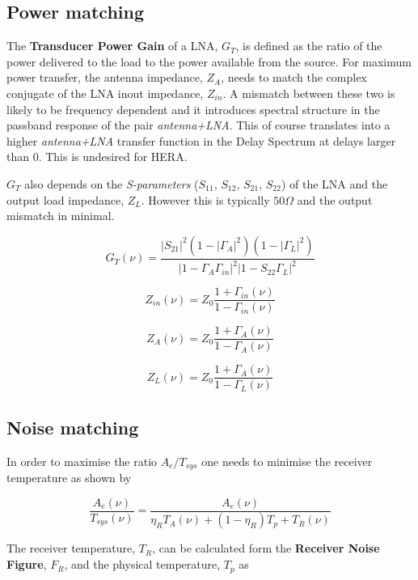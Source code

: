 \documentclass[11pt]{article}
\begin{document}
\subsection{Power matching}
The {\bf Transducer Power Gain} of a LNA, $G_T$, is defined as the ratio of the power delivered to the load to the power available from the source.
For maximum power transfer, the antenna impedance, $Z_A$, needs to match the complex conjugate of the LNA inout impedance, $Z_{in}$. A mismatch between these two is likely to be frequency dependent and it introduces spectral structure in the passband response of the pair {\em antenna+LNA}. This of course translates into a higher {\em antenna+LNA} transfer function in the Delay Spectrum at delays larger than 0. This is undesired for HERA.

$G_T$ also depends on the {\em S-parameters} ($S_{11}$, $S_{12}$, $S_{21}$, $S_{22}$) of the LNA and the output load impedance, $Z_L$. However this is typically $50\Omega$ and the output mismatch in minimal.

\begin{equation}
G_{T}(\nu) =\frac{|S_{21}|^2(1-|\Gamma_A|^2)(1-|\Gamma_L|^2)}{|1-\Gamma_A\Gamma_{in}|^2|1-S_{22}\Gamma_{L}|^2}
\end{equation}

\begin{equation}
Z_{in}(\nu) = Z_0\frac{1+\Gamma_{in}(\nu)}{1-\Gamma_{in}(\nu)}
\end{equation}

\begin{equation}
Z_{A}(\nu) = Z_0\frac{1+\Gamma_{A}(\nu)}{1-\Gamma_{A}(\nu)}
\end{equation}

\begin{equation}
Z_{L}(\nu) = Z_0\frac{1+\Gamma_{A}(\nu)}{1-\Gamma_{L}(\nu)}
\end{equation}

\subsection{Noise matching}
In order to maximise the ratio $A_e/T_{sys}$ one needs to minimise the receiver temperature as shown by 

\begin{equation}
\frac{A_{e}(\nu)}{T_{sys}(\nu)} = \frac{A_{e}(\nu)}{\eta_R T_A(\nu) + (1-\eta_R)T_p + T_R(\nu)}
\end{equation}

The receiver temperature, $T_R$, can be calculated form the {\bf Receiver Noise Figure}, $F_R$, and the physical temperature, $T_p$ as
\end{document}
